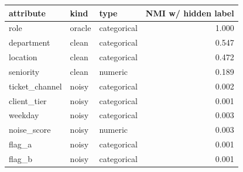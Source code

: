 \begin{tabular}{lllr}
\toprule
attribute & kind & type & NMI w/ hidden label \\
\midrule
role & oracle & categorical & 1.000 \\
department & clean & categorical & 0.547 \\
location & clean & categorical & 0.472 \\
seniority & clean & numeric & 0.189 \\
ticket\_channel & noisy & categorical & 0.002 \\
client\_tier & noisy & categorical & 0.001 \\
weekday & noisy & categorical & 0.003 \\
noise\_score & noisy & numeric & 0.003 \\
flag\_a & noisy & categorical & 0.001 \\
flag\_b & noisy & categorical & 0.001 \\
\bottomrule
\end{tabular}
